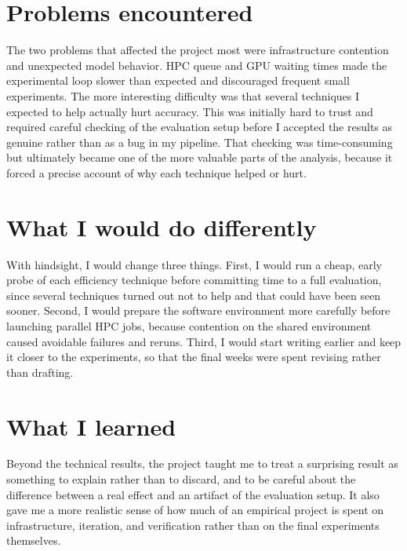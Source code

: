 \section{Problems encountered}

The two problems that affected the project most were infrastructure
contention and unexpected model behavior. HPC queue and GPU waiting times
made the experimental loop slower than expected and discouraged frequent
small experiments. The more interesting difficulty was that several
techniques I expected to help actually hurt accuracy. This was initially
hard to trust and required careful checking of the evaluation setup before
I accepted the results as genuine rather than as a bug in my pipeline. That
checking was time-consuming but ultimately became one of the more valuable
parts of the analysis, because it forced a precise account of why each
technique helped or hurt.

\section{What I would do differently}

With hindsight, I would change three things. First, I would run a cheap,
early probe of each efficiency technique before committing time to a full
evaluation, since several techniques turned out not to help and that could
have been seen sooner. Second, I would prepare the software environment
more carefully before launching parallel HPC jobs, because contention on
the shared environment caused avoidable failures and reruns. Third, I would
start writing earlier and keep it closer to the experiments, so that the
final weeks were spent revising rather than drafting.

\section{What I learned}

Beyond the technical results, the project taught me to treat a surprising
result as something to explain rather than to discard, and to be careful
about the difference between a real effect and an artifact of the
evaluation setup. It also gave me a more realistic sense of how much of an
empirical project is spent on infrastructure, iteration, and verification
rather than on the final experiments themselves.
